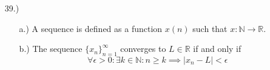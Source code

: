 \documentclass[12pt]{article}
\begin{document}
\begin{itemize}


    \item [39.)] \begin{itemize}
        \item [a.)] A sequence is defined as a function $x(n)$ such that $x:\mathbb{N}\rightarrow\mathbb{R}$.

        \item [b.)] The sequence $\{x_n\}^\infty_{n=1}$ converges to $L\in\mathbb{R}$ if and only if
        \[\forall\epsilon>0:\exists k\in\mathbb{N}:n\geq k\implies\vert x_n-L\vert<\epsilon\]
    \end{itemize}





\end{itemize}
\end{document}
